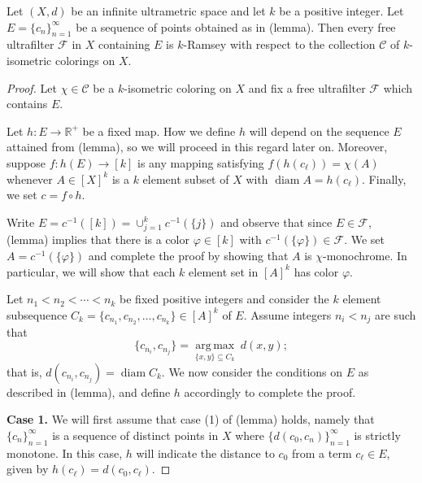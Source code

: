 \newpage
\begin{theorem}
Let \( (X,d) \) be an infinite ultrametric space and let \( k \) be a positive integer. Let \(E = \{ c_{n}  \}_{n = 1} ^{\infty}  \) be a sequence of points obtained as in (lemma). Then every free ultrafilter \( \mathcal{F}  \) in \( X \) containing \( E \) is \( k \)-Ramsey with respect to the collection \( \mathcal{C}  \) of \( k \)-isometric colorings on \( X \).
\end{theorem}
\begin{proof}
Let \( \chi \in \mathcal{C}  \) be a \( k \)-isometric coloring on \( X \) and fix a free ultrafilter \( \mathcal{F}  \) which contains \( E \).

Let \( h  : E \to \mathbb{R^{+}} \) be a fixed map. How we define \( h \) will depend on the sequence \( E \) attained from (lemma), so we will proceed in this regard later on. Moreover, suppose \( f : h (E) \to [k] \) is any mapping satisfying \( f(h(c_{\ell} )) = \chi (A) \) whenever \( A \in [X]^{k}  \) is a \( k \) element subset of \( X \) with \( \operatorname{diam}A = h(c_{\ell} ) \). Finally, we set \( c = f \circ h  \).

Write \( E = c ^{-1} ([k]) = \cup_{j=1}^{k} c^{-1} (\{ j \} )  \) and observe that since \( E \in \mathcal{F}  \), (lemma) implies that there is a color \( \varphi \in [k] \) with \( c ^{-1} (\{ \varphi  \} ) \in \mathcal{F}   \). We set \( A = c ^{-1} (\{ \varphi  \} )  \) and complete the proof by showing that \( A \) is \( \chi \)-monochrome. In particular, we will show that each \( k \) element set in \( [A]^{k}  \) has color \( \varphi \).




Let \( n_1 < n_2 < \cdots < n_{k}  \) be fixed positive integers and consider the \( k \) element subsequence \(C_{k} = \{ c_{n_1} , c_{n_2} , \hdots , c_{n_{k} }   \} \in [A]^{k} \) of \( E \). Assume integers \( n_{i} < n_{j}  \) are such that \[ \{ c_{n_{i} } , c_{n_{j} }  \} = \underset{\{ x, y \} \subseteq C_{k}  }{\operatorname{arg\,max}} \ d(x,y); \] that is, \( d(c_{n_{i} } , c_{n_{j} }) = \operatorname{diam}C_{k}  \). We now consider the conditions on \( E \) as described in (lemma), and define \( h \) accordingly to complete the proof.

\textbf{Case 1.} We will first assume that case (1) of (lemma) holds, namely that \( \{ c_{n}  \} _{n=1} ^{\infty}  \) is a sequence of distinct points in \( X \) where \( \{ d(c_0, c_{n} )  \}_{n = 1} ^{\infty} \) is strictly monotone. In this case, \( h \) will indicate the distance to \( c_0 \) from a term \( c_{\ell} \in E \), given by \( h (c_{\ell} ) = d(c_0, c_{\ell} ) \).


\end{proof}
